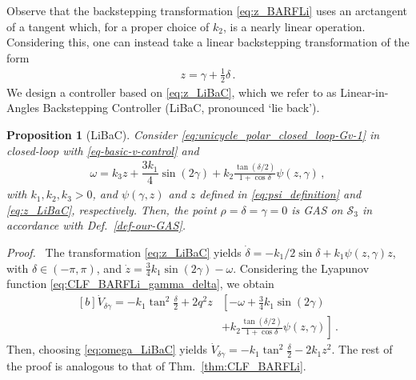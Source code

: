 \documentclass[journal,twoside,web]{ieeecolor}
\theoremstyle{definition}
\newtheorem{proposition}{Proposition}
\renewenvironment{proof}[1][Proof]{\par\pushQED{\qed}\normalfont\textit{#1.}~}{\popQED\par}
\begin{document}
Observe that the backstepping transformation \eqref{eq:z_BARFLi} uses an arctangent of a tangent which, for a proper choice of $k_2$, is a nearly linear operation. Considering this, one can instead take a linear backstepping transformation of the form
\begin{align}\label{eq:z_LiBaC}
z = \gamma + \frac{1}{2}\delta\,.
\end{align}
We design a controller based on \eqref{eq:z_LiBaC}, which we refer to as Linear-in-Angles Backstepping Controller (LiBaC, pronounced `lie back').
\begin{proposition}[LiBaC] \em
Consider
\eqref{eq:unicycle_polar_closed_loop-Gv-1} in closed-loop with \eqref{eq-basic-v-control} and 
\begin{equation}
\label{eq:omega_LiBaC}
\begin{aligned}
\omega = k_3z + \dfrac{3k_1}{4}\sin(2\gamma) +  k_2 \frac{\tan (\delta/2)}{1 + \cos \delta} \psi(z,\gamma) \,, \end{aligned} 
\end{equation}
with $k_1, k_2, k_3> 0$, and  $\psi(\gamma, z)$ and $z$ defined in \eqref{eq:psi_definition} and \eqref{eq:z_LiBaC}, respectively. Then, the point  $\rho = \delta = \gamma = 0$ is GAS on $\mathcal{S}_3$ in accordance with Def.~\ref{def-our-GAS}.
\end{proposition}

\begin{proof}
The transformation \eqref{eq:z_LiBaC} yields $\dot\delta = -k_1/2 \sin\delta + k_1\psi(z,\gamma)z$, with $\delta \in (-\pi,\pi)$, and  $\dot{z} = \frac{3}{4}k_1\sin(2\gamma)- \omega$.
 Considering the Lyapunov function \eqref{eq:CLF_BARFLi_gamma_delta}, we obtain 
\begin{equation}\label{eq:Vdot_LiBaC}
\begin{aligned}[b]
\dot V_{\delta \gamma} = -k_1\tan^2\frac{\delta}{2} +2 q^2 z &\left[-\omega +\frac{3}{4}k_1\sin(2\gamma) \right.  \\ 
&\left. +k_2 \frac{\tan(\delta/2)}{1+\cos\delta} \psi(z,\gamma)
\right]\,.
\end{aligned}
\end{equation}
Then, choosing \eqref{eq:omega_LiBaC}
yields $\dot{V}_{\delta\gamma} = -k_1 \tan^2\frac{\delta}{2} -2k_1z^2$. The rest of the proof is analogous to that of Thm.~\ref{thm:CLF_BARFLi}.
\end{proof}
\end{document}
